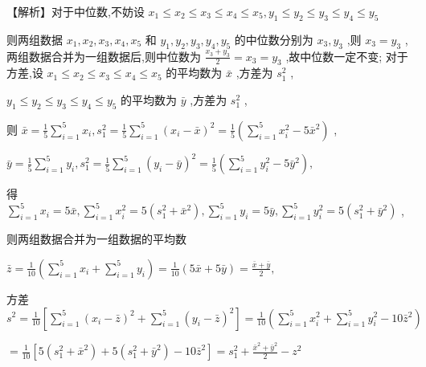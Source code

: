 \documentclass[10pt]{article}
\begin{document}
【解析】对于中位数,不妨设 \({x}_{1} \leq  {x}_{2} \leq  {x}_{3} \leq  {x}_{4} \leq  {x}_{5},{y}_{1} \leq  {y}_{2} \leq  {y}_{3} \leq  {y}_{4} \leq  {y}_{5}\)

则两组数据 \({x}_{1},{x}_{2},{x}_{3},{x}_{4},{x}_{5}\) 和 \({y}_{1},{y}_{2},{y}_{3},{y}_{4},{y}_{5}\) 的中位数分别为 \({x}_{3},{y}_{3}\) ,则 \({x}_{3} = {y}_{3}\) , 两组数据合并为一组数据后,则中位数为 \(\frac{{x}_{3} + {y}_{3}}{2} = {x}_{3} = {y}_{3}\) ,故中位数一定不变; 对于方差,设 \({x}_{1} \leq  {x}_{2} \leq  {x}_{3} \leq  {x}_{4} \leq  {x}_{5}\) 的平均数为 \(\bar{x}\) ,方差为 \({s}_{1}^{2}\) ,

\({y}_{1} \leq  {y}_{2} \leq  {y}_{3} \leq  {y}_{4} \leq  {y}_{5}\) 的平均数为 \(\bar{y}\) ,方差为 \({s}_{1}^{2}\) ,

则 \(\bar{x} = \frac{1}{5}\mathop{\sum }\limits_{{i = 1}}^{5}{x}_{i},{s}_{1}^{2} = \frac{1}{5}\mathop{\sum }\limits_{{i = 1}}^{5}{\left( {x}_{i} - \bar{x}\right) }^{2} = \frac{1}{5}\left( {\mathop{\sum }\limits_{{i = 1}}^{5}{x}_{i}^{2} - 5{\bar{x}}^{2}}\right)\) ,

\(\bar{y} = \frac{1}{5}\mathop{\sum }\limits_{{i = 1}}^{5}{y}_{i},{s}_{1}^{2} = \frac{1}{5}\mathop{\sum }\limits_{{i = 1}}^{5}{\left( {y}_{i} - \bar{y}\right) }^{2} = \frac{1}{5}\left( {\mathop{\sum }\limits_{{i = 1}}^{5}{y}_{i}^{2} - 5{\bar{y}}^{2}}\right) ,\)

得 \(\mathop{\sum }\limits_{{i = 1}}^{5}{x}_{i} = 5\bar{x},\mathop{\sum }\limits_{{i = 1}}^{5}{x}_{i}^{2} = 5\left( {{s}_{1}^{2} + {\bar{x}}^{2}}\right) ,\mathop{\sum }\limits_{{i = 1}}^{5}{y}_{i} = 5\bar{y},\mathop{\sum }\limits_{{i = 1}}^{5}{y}_{i}^{2} = 5\left( {{s}_{1}^{2} + {\bar{y}}^{2}}\right)\) ,

则两组数据合并为一组数据的平均数

\(\bar{z} = \frac{1}{10}\left( {\mathop{\sum }\limits_{{i = 1}}^{5}{x}_{i} + \mathop{\sum }\limits_{{i = 1}}^{5}{y}_{i}}\right)  = \frac{1}{10}\left( {5\bar{x} + 5\bar{y}}\right)  = \frac{\bar{x} + \bar{y}}{2},\)

方差 \({s}^{2} = \frac{1}{10}\left\lbrack  {\mathop{\sum }\limits_{{i = 1}}^{5}{\left( {x}_{i} - \bar{z}\right) }^{2} + \mathop{\sum }\limits_{{i = 1}}^{5}{\left( {y}_{i} - \bar{z}\right) }^{2}}\right\rbrack   = \frac{1}{10}\left( {\mathop{\sum }\limits_{{i = 1}}^{5}{x}_{i}^{2} + \mathop{\sum }\limits_{{i = 1}}^{5}{y}_{i}^{2} - {10}{\bar{z}}^{2}}\right)\)

\(= \frac{1}{10}\left\lbrack  {5\left( {{s}_{1}^{2} + {\bar{x}}^{2}}\right)  + 5\left( {{s}_{1}^{2} + {\bar{y}}^{2}}\right)  - {10}{\bar{z}}^{2}}\right\rbrack   = {s}_{1}^{2} + \frac{{\bar{x}}^{2} + {\bar{y}}^{2}}{2} - {z}^{2}\)
\end{document}
